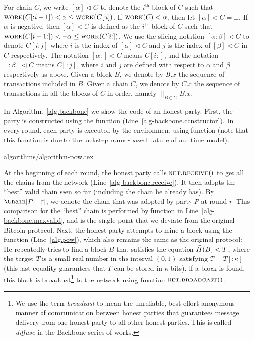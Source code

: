 \noindent
{}
For chain $C$, we write $[\alpha] \lhd C$
to denote the $i^\text{th}$ block of $C$ such that
$\textsc{work}(C[{:}{i - 1}]) < \alpha \leq \textsc{work}(C[{:}{i}])$.
If $\textsc{work}(C) < \alpha$, then let $[\alpha] \lhd C = \bot$.
If $\alpha$ is negative, then $[\alpha] \lhd C$ is defined as
the $i^\text{th}$ block of $C$ such that
$\textsc{work}(C[{i - 1}{:}]) < -\alpha \leq \textsc{work}(C[{i}{:}])$.
We use the slicing notation $[{\alpha}{:}{\beta}] \lhd C$ to denote
$C[{i}{:}{j}]$ where $i$ is the index of $[\alpha] \lhd C$
and $j$ is the index of $[\beta] \lhd C$ in $C$ respectively.
The notation $[{\alpha}{:}] \lhd C$ means $C[{i}{:}]$,
and the notation $[{:}\beta] \lhd C$ means $C[{:}{j}]$,
where $i$ and $j$ are defined with respect to $\alpha$ and $\beta$
respectively as above.
Given a block $B$, we denote by $B.x$ the sequence of transactions
included in $B$.
Given a chain $C$, we denote by $C.x$
the sequence of transactions in all the blocks of $C$ in order, namely
${\big\lVert}_{B \in C} B.x$.

In Algorithm~\ref{alg.backbone} we show the code of an honest party.
First, the party is constructed using the \constructor function (Line~\ref{alg-backbone.constructor}).
In every round, each party is executed by the environment using function \execute
(note that this function is due to the lockstep round-based nature of
our time model).

{algorithms/algorithm-pow.tex}

At the beginning of each round, the honest party calls $\textsc{net}.\textsc{re}\-\textsc{ceive}()$ to get all
the chains from the network (Line~\ref{alg-backbone.receive}).
It then adopts the ``best'' valid chain seen so far (including the chain
he already has). By $\Chain[P][][r]$, we denote the chain that was adopted
by party $P$ at round $r$.
This comparison for the ``best'' chain is performed by
function \maxvalid in Line~\ref{alg-backbone.maxvalid}, and
is the single point that we deviate from the original Bitcoin protocol.
Next, the honest party attempts to mine a block using the \pow function (Line~\ref{alg.pow}),
which also remains the same as the original protocol: He repeatedly tries to find a block $B$
that satisfies the \pow equation $\widetilde{H}(B) < T$, where the target $T$ is a small real number in
the interval $(0, 1)$ satisfying $T = T[{:}\kappa]$ (this last equality guarantees that $T$ can be stored in
$\kappa$ bits).
If a block is found, this block is broadcast\footnote{We use the term \emph{broadcast}
to mean the unreliable, best-effort anonymous manner of communication between honest parties that
guarantees message delivery from one honest party to all other honest parties.
This is called \emph{diffuse} in the Backbone series of works.}
to the network using function $\textsc{net}.\textsc{broadcast}()$.


